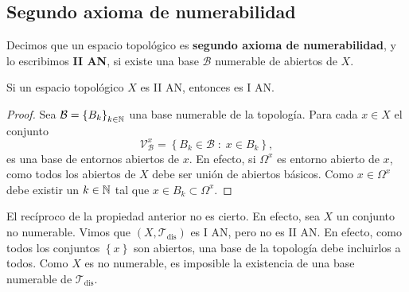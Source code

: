 \subsection{Segundo axioma de numerabilidad}
\begin{definition}
Decimos que un espacio topológico es \textbf{segundo axioma de numerabilidad}, y lo escribimos \textbf{II AN}, si existe una base $\displaystyle \mathcal{B} $ numerable de abiertos de $\displaystyle X $.
\end{definition}
\begin{prop}
Si un espacio topológico $\displaystyle X $ es II AN, entonces es I AN.
\end{prop}
\begin{proof}
	Sea $\displaystyle \mathcal{B}= \left\{ B_{k}\right\} _{k\in \mathbb{N} } $ una base numerable de la topología. Para cada $\displaystyle x \in X $ el conjunto
	\[\mathcal{V}_{\mathcal{B}}^{x}= \left\{ B_{k}\in \mathcal{B} \; : \; x \in B_{k}\right\}  ,\]
	es una base de entornos abiertos de $\displaystyle x $. En efecto, si $\displaystyle \Omega ^{x} $ es entorno abierto de $\displaystyle x $, como todos los abiertos de $\displaystyle X $ debe ser unión de abiertos básicos. Como $\displaystyle x \in \Omega^{x} $ debe existir un $\displaystyle k\in \mathbb{N} $ tal que $\displaystyle x \in B_{k}\subset \Omega^{x} $.
\end{proof}
\begin{observation}
El recíproco de la propiedad anterior no es cierto. En efecto, sea $\displaystyle X  $ un conjunto no numerable. Vimos que $\displaystyle \left(X, \mathcal{T}_{\text{dis}}\right) $ es I AN, pero no es II AN. En efecto, como todos los conjuntos $\displaystyle \left\{ x\right\}  $ son abiertos, una base de la topología debe incluirlos a todos. Como $\displaystyle X $ es no numerable, es imposible la existencia de una base numerable de $\displaystyle \mathcal{T}_{\text{dis}} $.
\end{observation}

